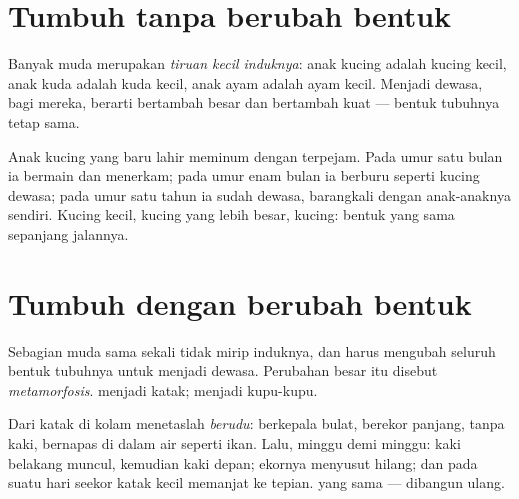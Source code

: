 \section{Tumbuh tanpa berubah bentuk}

\begin{definition}\label{def:g2:animals-grow-up:direct}
Banyak  muda merupakan \emph{tiruan kecil
induknya}: anak kucing adalah kucing kecil,
anak kuda adalah kuda kecil, anak ayam adalah ayam kecil. Menjadi
dewasa, bagi mereka, berarti bertambah besar dan bertambah kuat ---
bentuk tubuhnya tetap sama.
\end{definition}

\begin{example}\label{ex:g2:animals-grow-up:kitten}
Anak kucing yang baru lahir meminum  dengan  terpejam. Pada
umur satu bulan ia bermain dan menerkam; pada umur enam bulan ia
berburu seperti kucing dewasa; pada umur satu tahun ia sudah dewasa,
barangkali dengan anak-anaknya sendiri. Kucing kecil, kucing yang
lebih besar, kucing: bentuk yang sama sepanjang jalannya.
\end{example}

\section{Tumbuh dengan berubah bentuk}

\begin{definition}[Metamorfosis]\label{def:g2:animals-grow-up:metamorphosis}
Sebagian  muda sama sekali tidak mirip induknya, dan harus
mengubah seluruh bentuk tubuhnya untuk menjadi dewasa. Perubahan besar
itu disebut \emph{metamorfosis}.  menjadi
katak;  menjadi kupu-kupu.
\end{definition}

\begin{example}\label{ex:g2:animals-grow-up:frog}
Dari  katak di kolam menetaslah \emph{berudu}:
berkepala bulat, berekor panjang, tanpa kaki, bernapas di dalam air
seperti ikan. Lalu, minggu demi minggu: kaki belakang muncul, kemudian
kaki depan; ekornya menyusut hilang; dan pada suatu hari seekor katak
kecil memanjat ke tepian.  yang sama --- dibangun ulang.
\end{example}

